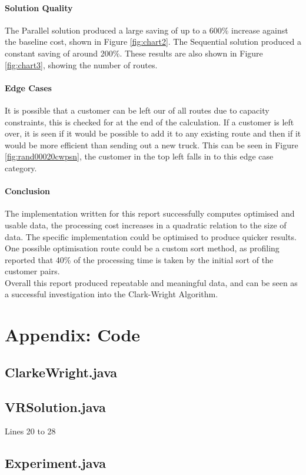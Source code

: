 \documentclass[conference]{acmsiggraph}
\begin{document}
\paragraph{Solution Quality}
The Parallel solution produced a large saving of up to a 600\% increase against the baseline cost, shown in Figure \ref{fig:chart2}. The Sequential solution produced a constant saving of around 200\%. These results are also shown in Figure \ref{fig:chart3}, showing the number of routes.

\paragraph{Edge Cases}
It is possible that a customer can be left our of all routes due to capacity constraints, this is checked for at the end of the calculation. If a customer is left over, it is seen if it would be possible to add it to any existing route and then if it would be more efficient than sending out a new truck. This can be seen in Figure \ref{fig:rand00020cwpsn}, the customer in the top left falls in to this edge case category.

\paragraph{Conclusion}
The implementation written for this report successfully computes optimised and usable data, the processing cost increases in a quadratic relation to the size of data. The specific implementation could be optimised to produce quicker results. One possible optimisation route could be a custom sort method, as profiling reported that 40\% of the processing time is taken by the initial sort of the customer pairs.\\
Overall this report produced repeatable and meaningful data, and can be seen as a successful investigation into the Clark-Wright Algorithm.


\clearpage

\section{Appendix: Code}
\subsection{ClarkeWright.java}


\vfill

\subsection{VRSolution.java}
Lines 20 to 28


\subsection{Experiment.java}

\end{document}
